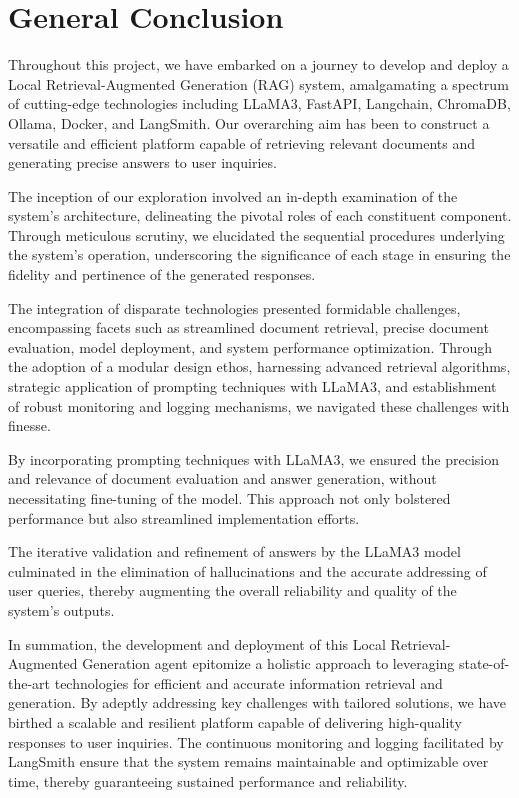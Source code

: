 \chapter{General Conclusion}

Throughout this project, we have embarked on a journey to develop and deploy a Local Retrieval-Augmented Generation (RAG) system, amalgamating a spectrum of cutting-edge technologies including LLaMA3, FastAPI, Langchain, ChromaDB, Ollama, Docker, and LangSmith. Our overarching aim has been to construct a versatile and efficient platform capable of retrieving relevant documents and generating precise answers to user inquiries.

The inception of our exploration involved an in-depth examination of the system's architecture, delineating the pivotal roles of each constituent component. Through meticulous scrutiny, we elucidated the sequential procedures underlying the system's operation, underscoring the significance of each stage in ensuring the fidelity and pertinence of the generated responses.

The integration of disparate technologies presented formidable challenges, encompassing facets such as streamlined document retrieval, precise document evaluation, model deployment, and system performance optimization. Through the adoption of a modular design ethos, harnessing advanced retrieval algorithms, strategic application of prompting techniques with LLaMA3, and establishment of robust monitoring and logging mechanisms, we navigated these challenges with finesse.

By incorporating prompting techniques with LLaMA3, we ensured the precision and relevance of document evaluation and answer generation, without necessitating fine-tuning of the model. This approach not only bolstered performance but also streamlined implementation efforts.

The iterative validation and refinement of answers by the LLaMA3 model culminated in the elimination of hallucinations and the accurate addressing of user queries, thereby augmenting the overall reliability and quality of the system's outputs.

In summation, the development and deployment of this Local Retrieval-Augmented Generation agent epitomize a holistic approach to leveraging state-of-the-art technologies for efficient and accurate information retrieval and generation. By adeptly addressing key challenges with tailored solutions, we have birthed a scalable and resilient platform capable of delivering high-quality responses to user inquiries. The continuous monitoring and logging facilitated by LangSmith ensure that the system remains maintainable and optimizable over time, thereby guaranteeing sustained performance and reliability.